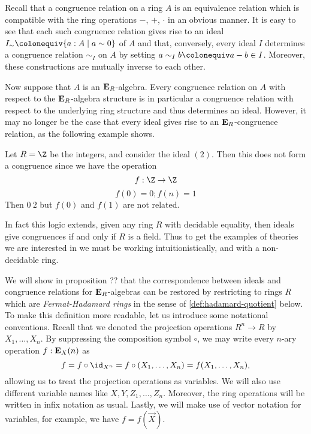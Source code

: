 {Recall that a congruence relation on a ring \(A\) is an equivalence relation which is compatible with the ring operations \(-\), \(+\), \(\cdot\) in an obvious manner.
It is easy to see that each such congruence relation gives rise to an ideal \(I_\sim\colonequiv \{a:A\mid a\sim 0\}\) of \(A\) and that, conversely, every ideal \(I\) determines a congruence relation \(\sim_I\) on \(A\) by setting \(a\sim_I b\colonequiv a-b\in I\).
Moreover, these constructions are mutually inverse to each other.

Now suppose that \(A\) is an \(\mathbf{E}_R\)-algebra.
Every congruence relation on \(A\) with respect to the \(\mathbf{E}_R\)-algebra structure is in particular a congruence relation with respect to the underlying ring structure and thus determines an ideal.
However, it may no longer be the case that every ideal gives rise to an \(\mathbf{E}_R\)-congruence relation, as the following example shows.

\begin{example}
  Let $R = \Z$ be the integers, and consider the ideal $(2)$.
  Then this does not form a congruence since we have the operation 
  \[ f : \Z \to \Z \]
  \[ f(0) = 0 ; f(n) = 1 \]
  Then $0 ~ 2$ but $f(0)$ and $f(1)$ are not related.
\end{example}

\begin{remark}
  In fact this logic extends, given any ring $R$ with decidable equality, then ideals give congruences if and only if $R$ is a field.
  Thus to get the examples of theories we are interested in we must be working intuitionistically, and with a non-decidable ring.
\end{remark}

We will show in proposition ?? that the correspondence between ideals and congruence relations for \(\mathbf{E}_R\)-algebras can be restored by restricting to rings \(R\) which are \emph{Fermat-Hadamard rings} in the sense of \cref{def:hadamard-quotient} below.
To make this definition more readable, let us introduce some notational conventions.
Recall that we denoted the projection operations \(R^n\to R\) by \(X_1,\dots, X_n\).
By suppressing the composition symbol \(\circ\), we may write every \(n\)-ary operation \(f:\mathbf{E}_X(n)\) as
\[
  f = f\circ\id_{X^n} = f \circ (X_1,\dots,X_n) = f(X_1,\dots,X_n),
\]
allowing us to treat the projection operations as variables.
We will also use different variable names like \(X,Y,Z_1,\dots,Z_n\).
Moreover, the ring operations will be written in infix notation as usual.
Lastly, we will make use of vector notation for variables, for example, we have \(f = f(\vec X)\).


}
